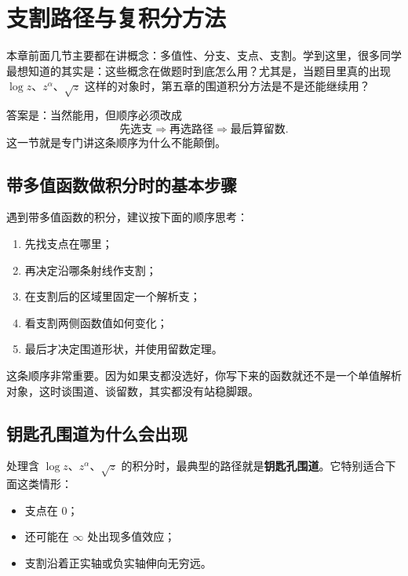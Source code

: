 \section{支割路径与复积分方法}

\begin{wulibj}[为什么这一节必须回到积分]
本章前面几节主要都在讲概念：多值性、分支、支点、支割。学到这里，很多同学最想知道的其实是：这些概念在做题时到底怎么用？尤其是，当题目里真的出现 $\log z$、$z^\alpha$、$\sqrt{z}$ 这样的对象时，第五章的围道积分方法是不是还能继续用？

答案是：当然能用，但顺序必须改成
\[
    \text{先选支} \Longrightarrow \text{再选路径} \Longrightarrow \text{最后算留数}.
\]
这一节就是专门讲这条顺序为什么不能颠倒。
\end{wulibj}

\subsection{带多值函数做积分时的基本步骤}

\begin{tishi}[做题时的判断顺序]
遇到带多值函数的积分，建议按下面的顺序思考：
\begin{enumerate}
    \item 先找支点在哪里；
    \item 再决定沿哪条射线作支割；
    \item 在支割后的区域里固定一个解析支；
    \item 看支割两侧函数值如何变化；
    \item 最后才决定围道形状，并使用留数定理。
\end{enumerate}
\end{tishi}

这条顺序非常重要。因为如果支都没选好，你写下来的函数就还不是一个单值解析对象，这时谈围道、谈留数，其实都没有站稳脚跟。

\subsection{钥匙孔围道为什么会出现}

处理含 $\log z$、$z^\alpha$、$\sqrt{z}$ 的积分时，最典型的路径就是\textbf{钥匙孔围道}。它特别适合下面这类情形：
\begin{itemize}
    \item 支点在 $0$；
    \item 还可能在 $\infty$ 处出现多值效应；
    \item 支割沿着正实轴或负实轴伸向无穷远。
\end{itemize}


